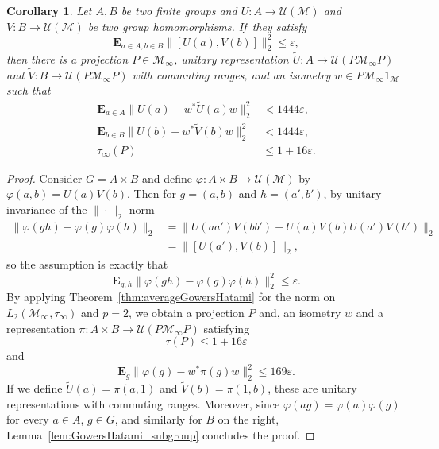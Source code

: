 \documentclass[JEP,XML,SOM,Unicode,published]{cedram}
\theoremstyle{plain}
\newtheorem{corollary}[theorem]{Corollary}
\theoremstyle{definition}
\newcommand{\cM}{\mathcal{M}}
\newcommand{\E}{\mathbf{E}}
\newcommand{\cU}{\mathcal{U}}
\begin{document}
\begin{corollary}\label{cor:averageGowersHatami_products} Let $A,B$ be two finite groups and $U:A \to \cU(\cM)$ and $V: B \to \cU(\cM)$ be two group homomorphisms. If~they satisfy
\[
\E_{a \in A,b \in B} \|[U(a),V(b)]\|_2^2 \leq \varepsilon,
\]
then there is a projection $P \in \cM_\infty$, unitary representation $\tilde{U}: A \to \cU(P\cM_\infty P)$ and $\tilde{V}: B \to \cU(P\cM_\infty P)$ with commuting ranges, and an isometry $w \in P \cM_\infty 1_\cM$ such that
\begin{align*}
\E_{a \in A} \|U(a)-w^* \tilde U(a) w\|_2^2&<1444\varepsilon,
\\
\E_{b \in B} \|U(b)-w^* \tilde V(b) w\|_2^2&<1444\varepsilon,
\\
\tau_\infty(P)&\leq 1+16\varepsilon.
\end{align*}
\end{corollary}
\begin{proof} Consider $G=A \times B$ and define $\varphi:A \times B \to \cU(\cM)$ by $\varphi(a,b) = U(a) V(b)$. Then for $g=(a,b)$ and $h=(a',b')$, by unitary invariance of the $\|{\cdot}\|_2$-norm
\begin{align*} \|\varphi(gh) - \varphi(g) \varphi(h)\|_2 &= \| U(aa') V(bb') - U(a) V(b) U(a') V(b')\|_2\\ &= \|[U(a'),V(b)]\|_2,
\end{align*}
so the assumption is exactly that
\[
\E_{g,h} \|\varphi(gh) - \varphi(g) \varphi(h)\|_2^2 \leq \varepsilon.
\]
By applying Theorem~\ref{thm:averageGowersHatami} for the norm on $L_2(\cM_\infty,\tau_\infty)$ and $p=2$, we obtain a projection $P$ and, an isometry $w$ and a representation $\pi:A \times B \to \cU(P\cM_\infty P)$ satisfying
\[
\tau(P) \leq 1+16 \varepsilon
\]
and
\begin{equation}\label{eq:phi_close_to_rho} \E_g \|\varphi(g) - w^* \pi(g) w\|_2^2 \leq 169 \varepsilon.\end{equation}
If we define $\tilde{U}(a) = \pi(a,1)$ and $\tilde{V}(b) = \pi(1,b)$, these are unitary representations with commuting ranges. Moreover, since $\varphi(a g) =\varphi(a) \varphi(g)$ for every $a \in A$, $g \in G$, and similarly for $B$ on the right, Lemma~\ref{lem:GowersHatami_subgroup} concludes the proof.
\end{proof}
\end{document}

